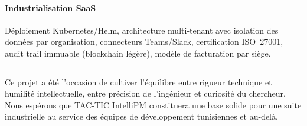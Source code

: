 \paragraph{Industrialisation SaaS}
Déploiement Kubernetes/Helm, architecture multi-tenant avec isolation des données
par organisation, connecteurs Teams/Slack, certification ISO~27001, audit trail
immuable (blockchain légère), modèle de facturation par siège.

\bigskip
\noindent\rule{\linewidth}{0.5pt}

\medskip
Ce projet a été l'occasion de cultiver l'équilibre entre rigueur technique
et humilité intellectuelle, entre précision de l'ingénieur et curiosité du
chercheur. Nous espérons que TAC-TIC IntelliPM constituera une base solide
pour une suite industrielle au service des équipes de développement tunisiennes
et au-delà.
